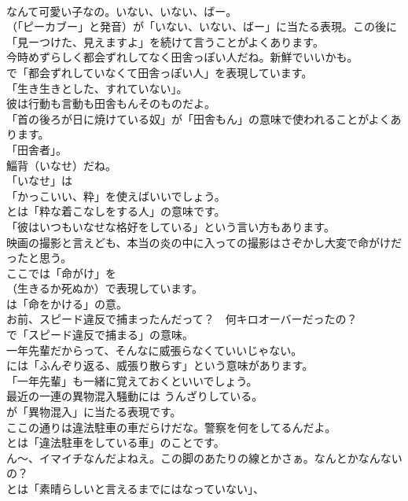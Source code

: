 \documentclass[8pt]{extreport}
\begin{document}
\begin{CJK}{UTF8}{min}
\\	なんて可愛い子なの。いない、いない、ばー。 
\\	（「ピーカブー」と発音）が「いない、いない、ばー」に当たる表現。この後に
\\	「見ーつけた、見えますよ」を続けて言うことがよくあります。	
\\	今時めずらしく都会ずれしてなく田舎っぽい人だね。新鮮でいいかも。 
\\	で「都会ずれしていなくて田舎っぽい人」を表現しています。
\\	「生き生きとした、すれていない」。	
\\	彼は行動も言動も田舎もんそのものだよ。 
\\	「首の後ろが日に焼けている奴」が「田舎もん」の意味で使われることがよくあります。
\\	「田舎者」。	
\\	鯔背（いなせ）だね。 
\\	「いなせ」は
\\	「かっこいい、粋」を使えばいいでしょう。
\\	とは「粋な着こなしをする人」の意味です。
\\	「彼はいつもいなせな格好をしている」という言い方もあります。	
\\	映画の撮影と言えども、本当の炎の中に入っての撮影はさぞかし大変で命がけだったと思う。 
\\	ここでは「命がけ」を 
\\	（生きるか死ぬか）で表現しています。
\\	は「命をかける」の意。	
\\	お前、スピード違反で捕まったんだって？　何キロオーバーだったの？ 
\\	で「スピード違反で捕まる」の意味。	
\\	一年先輩だからって、そんなに威張らなくていいじゃない。 
\\	には「ふんぞり返る、威張り散らす」という意味があります。
\\	「一年先輩」も一緒に覚えておくといいでしょう。	
\\	最近の一連の異物混入騒動には うんざりしている。 
\\	が「異物混入」に当たる表現です。	
\\	ここの通りは違法駐車の車だらけだな。警察を何をしてるんだよ。 
\\	とは「違法駐車をしている車」のことです。	
\\	ん～、イマイチなんだよねえ。この脚のあたりの線とかさぁ。なんとかなんないの？ 
\\	とは「素晴らしいと言えるまでにはなっていない」、

\end{CJK}
\end{document}
